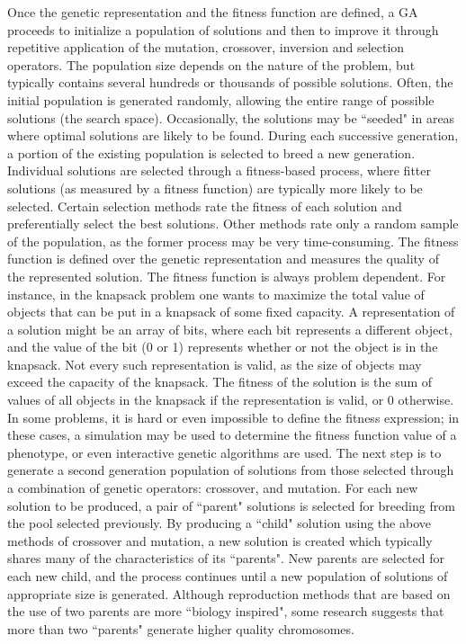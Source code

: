 Once the genetic representation and the fitness function are defined, a GA proceeds to initialize a population of solutions and then to improve it through repetitive application of the mutation, crossover, inversion and selection operators.
The population size depends on the nature of the problem, but typically contains several hundreds or thousands of possible solutions. Often, the initial population is generated randomly, allowing the entire range of possible solutions (the search space). Occasionally, the solutions may be ``seeded" in areas where optimal solutions are likely to be found.
During each successive generation, a portion of the existing population is selected to breed a new generation. Individual solutions are selected through a fitness-based process, where fitter solutions (as measured by a fitness function) are typically more likely to be selected. Certain selection methods rate the fitness of each solution and preferentially select the best solutions. Other methods rate only a random sample of the population, as the former process may be very time-consuming.
The fitness function is defined over the genetic representation and measures the quality of the represented solution. The fitness function is always problem dependent. For instance, in the knapsack problem one wants to maximize the total value of objects that can be put in a knapsack of some fixed capacity. A representation of a solution might be an array of bits, where each bit represents a different object, and the value of the bit (0 or 1) represents whether or not the object is in the knapsack. Not every such representation is valid, as the size of objects may exceed the capacity of the knapsack. The fitness of the solution is the sum of values of all objects in the knapsack if the representation is valid, or $0$ otherwise.
In some problems, it is hard or even impossible to define the fitness expression; in these cases, a simulation may be used to determine the fitness function value of a phenotype, or even interactive genetic algorithms are used.
The next step is to generate a second generation population of solutions from those selected through a combination of genetic operators: crossover, and mutation.
For each new solution to be produced, a pair of ``parent" solutions is selected for breeding from the pool selected previously. By producing a ``child" solution using the above methods of crossover and mutation, a new solution is created which typically shares many of the characteristics of its ``parents". New parents are selected for each new child, and the process continues until a new population of solutions of appropriate size is generated. Although reproduction methods that are based on the use of two parents are more ``biology inspired", some research suggests that more than two ``parents" generate higher quality chromosomes.
